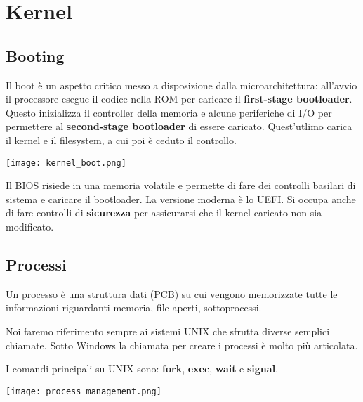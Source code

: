 \newpage
\section{Kernel}
\subsection{Booting}
Il boot è un aspetto critico messo a disposizione dalla microarchitettura: all'avvio il processore esegue il codice nella ROM per caricare il \textbf{first-stage bootloader}. Questo inizializza il controller della memoria e alcune periferiche di I/O per permettere al \textbf{second-stage bootloader} di essere caricato. Quest'utlimo carica il kernel e il filesystem, a cui poi è ceduto il controllo.
\begin{center}
	\texttt{[image: kernel\_boot.png]}
\end{center}
\begin{note}
	Il BIOS risiede in una memoria volatile e permette di fare dei controlli basilari di sistema e caricare il bootloader. La versione moderna è lo UEFI. Si occupa anche di fare controlli di \textbf{sicurezza} per assicurarsi che il kernel caricato non sia modificato.
\end{note}
\subsection{Processi}
Un processo è una struttura dati (PCB) su cui vengono memorizzate tutte le informazioni riguardanti memoria, file aperti, sottoprocessi.
\begin{note}
	Noi faremo riferimento sempre ai sistemi UNIX che sfrutta diverse semplici chiamate. Sotto Windows la chiamata per creare i processi è molto più articolata.
\end{note}
I comandi principali su UNIX sono: \textbf{fork}, \textbf{exec}, \textbf{wait} e \textbf{signal}.
\begin{center}
	\texttt{[image: process\_management.png]}
\end{center}

